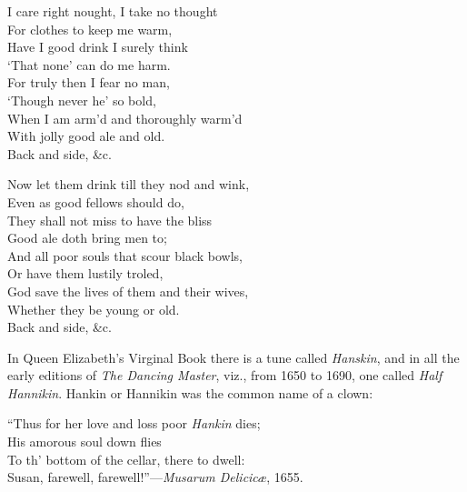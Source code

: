 \begin{dcverse}
\begin{altverse}
I care right nought, I take no thought\\
For clothes to keep me warm,\\
Have I good drink I surely think\\
‘That none’ can do me harm.\\
For truly then I fear no man,\\
‘Though never he’ so bold,\\
When I am arm’d and thoroughly warm’d\\
With jolly good ale and old.\\
\hspace{6em}Back and side, \&c.
\end{altverse}

\begin{altverse}
Now let them drink till they nod and wink,\\
Even as good fellows should do,\\
They shall not miss to have the bliss\\
Good ale doth bring men to;\\
And all poor souls that scour black bowls,\\
Or have them lustily troled,\\
God save the lives of them and their wives,\\
Whether they be young or old.\\
\hspace{6em}Back and side, \&c.
\end{altverse}
\end{dcverse}
\normalsize



In Queen Elizabeth’s Virginal Book there is a tune called \textit{Hanskin}, and in all
the early editions of \textit{The Dancing Master}, viz., from 1650 to 1690, one called
\textit{Half Hannikin}. Hankin or Hannikin was the common name of a clown:

\begin{scverse}
“Thus for her love and loss poor \textit{Hankin} dies;\\
His amorous soul down flies\\
To th’ bottom of the cellar, there to dwell:\\
Susan, farewell, farewell!”—\textit{Musarum Delicicæ}, 1655.
\end{scverse}

